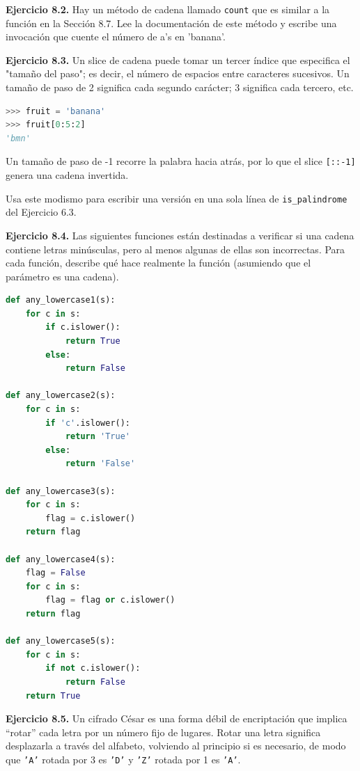 \textbf{Ejercicio 8.2.} Hay un método de cadena llamado \texttt{count} que es similar a la función en la Sección 8.7. Lee la documentación de este método y escribe una invocación que cuente el número de a's en 'banana'.

\textbf{Ejercicio 8.3.} Un slice de cadena puede tomar un tercer índice que especifica el "tamaño del paso"; es decir, el número de espacios entre caracteres sucesivos. Un tamaño de paso de 2 significa cada segundo carácter; 3 significa cada tercero, etc.

\begin{lstlisting}[language=Python]
>>> fruit = 'banana'
>>> fruit[0:5:2]
'bmn'
\end{lstlisting}

Un tamaño de paso de -1 recorre la palabra hacia atrás, por lo que el slice \texttt{[::-1]} genera una cadena invertida.

Usa este modismo para escribir una versión en una sola línea de \texttt{is\_palindrome} del Ejercicio 6.3.

\textbf{Ejercicio 8.4.} Las siguientes funciones están destinadas a verificar si una cadena contiene letras minúsculas, pero al menos algunas de ellas son incorrectas. Para cada función, describe qué hace realmente la función (asumiendo que el parámetro es una cadena).

\begin{lstlisting}[language=Python]
def any_lowercase1(s):
    for c in s:
        if c.islower():
            return True
        else:
            return False

def any_lowercase2(s):
    for c in s:
        if 'c'.islower():
            return 'True'
        else:
            return 'False'

def any_lowercase3(s):
    for c in s:
        flag = c.islower()
    return flag

def any_lowercase4(s):
    flag = False
    for c in s:
        flag = flag or c.islower()
    return flag

def any_lowercase5(s):
    for c in s:
        if not c.islower():
            return False
    return True
\end{lstlisting}

\textbf{Ejercicio 8.5.} Un cifrado César es una forma débil de encriptación que implica ``rotar'' cada letra por un número fijo de lugares. Rotar una letra significa desplazarla a través del alfabeto, volviendo al principio si es necesario, de modo que \texttt{'A'} rotada por 3 es \texttt{'D'} y \texttt{'Z'} rotada por 1 es \texttt{'A'}.

